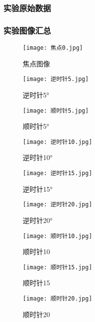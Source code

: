 \documentclass[dvipsnames, svgnames,a4paper,11pt]{article}
\begin{document}
\subsubsection{实验原始数据}
\subsubsection{实验图像汇总}
\begin{figure}[H]
	\begin{minipage}[b]{0.3\linewidth}
	  \centering
	  \texttt{[image: 焦点0.jpg]}
	  \caption{焦点图像}
	  \label{fig:sub1}
	\end{minipage}
	\hfill
	\begin{minipage}[b]{0.3\linewidth}
	  \centering
	  \texttt{[image: 逆时针5.jpg]}
	  \caption{逆时针5°}
	  \label{fig:sub2}
	\end{minipage}
	\hfill
	\begin{minipage}[b]{0.3\linewidth}
	  \centering
	  \texttt{[image: 顺时针5.jpg]}
	  \caption{顺时针5°}
	  \label{fig:sub3}
	\end{minipage}
  \end{figure}
  

  \begin{figure}[H]
	\begin{minipage}[b]{0.3\linewidth}
	  \centering
	  \texttt{[image: 逆时针10.jpg]}
	  \caption{逆时针10°}
	  \label{fig:sub1}
	\end{minipage}
	\hfill
	\begin{minipage}[b]{0.3\linewidth}
	  \centering
	  \texttt{[image: 逆时针15.jpg]}
	  \caption{逆时针15°}
	  \label{fig:sub2}
	\end{minipage}
	\hfill
	\begin{minipage}[b]{0.3\linewidth}
	  \centering
	  \texttt{[image: 逆时针20.jpg]}
	  \caption{逆时针20°}
	  \label{fig:sub3}
	\end{minipage}
  \end{figure}
  
  \begin{figure}[H]
	\begin{minipage}[b]{0.3\linewidth}
	  \centering
	  \texttt{[image: 顺时针10.jpg]}
	  \caption{顺时针10}
	\end{minipage}
	\hfill
	\begin{minipage}[b]{0.3\linewidth}
	  \centering
	  \texttt{[image: 顺时针15.jpg]}
	  \caption{顺时针15}
	\end{minipage}
	\hfill
	\begin{minipage}[b]{0.3\linewidth}
	  \centering
	  \texttt{[image: 顺时针20.jpg]}
	  \caption{顺时针20}
	\end{minipage}
  \end{figure}
\end{document}
